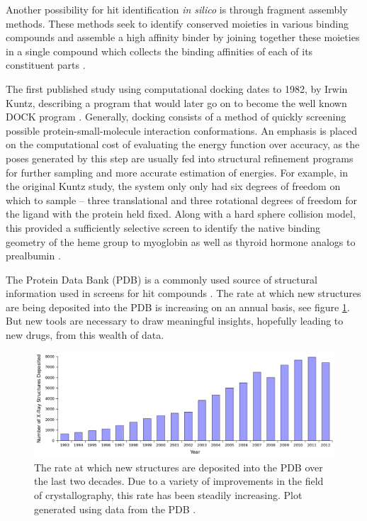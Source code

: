 Another possibility for hit identification {\it in silico} is through fragment assembly methods.
These methods seek to identify conserved moieties in various binding compounds and assemble a high affinity binder by joining together these moieties in a single compound which collects the binding affinities of each of its constituent parts \cite{jorgensen2006computer,jorgensen2004many,jorgensen2009efficient}.

The first published study using computational docking dates to 1982, by Irwin Kuntz, describing a program that would later go on to become the well known DOCK program \cite{kuntz1982geometric}.
Generally, docking consists of a method of quickly screening possible protein-small-molecule interaction conformations.
An emphasis is placed on the computational cost of evaluating the energy function over accuracy, as the poses generated by this step are usually fed into structural refinement programs for further sampling and more accurate estimation of energies.
For example, in the original Kuntz study, the system only only had six degrees of freedom on which to sample -- three translational and three rotational degrees of freedom for the ligand with the protein held fixed.
Along with a hard sphere collision model, this provided a sufficiently selective screen to identify the native binding geometry of the heme group to myoglobin as well as thyroid hormone analogs to prealbumin \cite{kuntz1982geometric}.

The Protein Data Bank (PDB) is a commonly used source of structural information used in screens for hit compounds \cite{abola1984protein}. 
The rate at which new structures are being deposited into the PDB is increasing on an annual basis, see figure \ref{figure:pdb_growth}.
But new tools are necessary to draw meaningful insights, hopefully leading to new drugs, from this wealth of data.
\begin{figure}[H]
\begin{center}
\includegraphics[width=\textwidth]{figures/pdb_deposit_rate.png}
\caption{The rate at which new structures are deposited into the PDB over the last two decades.
Due to a variety of improvements in the field of crystallography, this rate has been steadily increasing.
Plot generated using data from the PDB \protect\cite{berman2003announcing,berman2000protein}.}
\label{figure:pdb_growth}
\end{center}
\end{figure}


